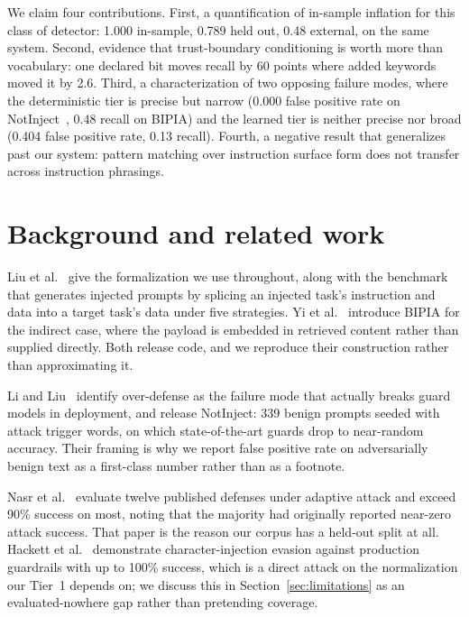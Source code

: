 \documentclass[sigconf,anonymous,review]{acmart}
\begin{document}
We claim four contributions. First, a quantification of in-sample inflation for
this class of detector: 1.000 in-sample, 0.789 held out, 0.48 external, on the
same system. Second, evidence that trust-boundary conditioning is worth more than
vocabulary: one declared bit moves recall by 60 points where added keywords moved
it by 2.6. Third, a characterization of two opposing failure modes, where the
deterministic tier is precise but narrow (0.000 false positive rate on
NotInject~\cite{li2024injecguard}, 0.48 recall on BIPIA) and the learned tier is
neither precise nor broad (0.404 false positive rate, 0.13 recall). Fourth, a
negative result that generalizes past our system: pattern matching over
instruction surface form does not transfer across instruction phrasings.

\section{Background and related work}

Liu et al.~\cite{liu2024formalizing} give the formalization we use throughout,
along with the benchmark that generates injected prompts by splicing an injected
task's instruction and data into a target task's data under five strategies. Yi
et al.~\cite{yi2023bipia} introduce BIPIA for the indirect case, where the
payload is embedded in retrieved content rather than supplied directly. Both
release code, and we reproduce their construction rather than approximating it.

Li and Liu~\cite{li2024injecguard} identify over-defense as the failure mode that
actually breaks guard models in deployment, and release NotInject: 339 benign
prompts seeded with attack trigger words, on which state-of-the-art guards drop
to near-random accuracy. Their framing is why we report false positive rate on
adversarially benign text as a first-class number rather than as a footnote.

Nasr et al.~\cite{nasr2025attacker} evaluate twelve published defenses under
adaptive attack and exceed 90\% success on most, noting that the majority had
originally reported near-zero attack success. That paper is the reason our corpus
has a held-out split at all. Hackett et al.~\cite{hackett2025bypassing}
demonstrate character-injection evasion against production guardrails with up to
100\% success, which is a direct attack on the normalization our Tier~1 depends
on; we discuss this in Section~\ref{sec:limitations} as an evaluated-nowhere gap
rather than pretending coverage.
\end{document}
